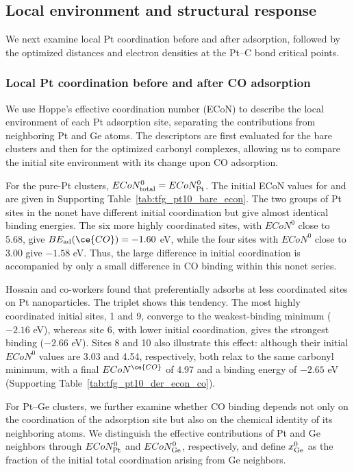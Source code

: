 \subsection{Local environment and structural response}

We next examine local Pt coordination before and after
 adsorption, followed by the optimized  distances and
electron densities at the Pt--C bond critical points.

\subsubsection{Local Pt coordination before and after CO adsorption}
\label{subsec:local_pt_coordination}

We use Hoppe's effective coordination number (ECoN) to describe the
local environment of each Pt adsorption site, separating the contributions
from neighboring Pt and Ge atoms. The descriptors are first evaluated for the
bare clusters and then for the optimized carbonyl complexes, allowing us to compare the
initial site environment with its change upon CO adsorption.


{For the pure-Pt clusters, $ECoN_{\rm total}^{0}=ECoN_{\rm Pt}^{0}$.
The initial ECoN values for  and  are given in
Supporting Table~\ref{tab:tfg_pt10_bare_econ}.
The two groups of Pt sites in the nonet  have different initial
coordination but give almost identical binding energies. The six more highly
coordinated sites, with $ECoN^{0}$ close to 5.68, give
$BE_{\rm ad}(\ce{CO})=-1.60$ eV, while the four sites with $ECoN^{0}$ close
to 3.00 give $-1.58$ eV. Thus, the
large difference in initial coordination is accompanied by only a small
difference in CO binding within this nonet series.}

{Hossain and co-workers found that  preferentially adsorbs at
less coordinated sites on Pt nanoparticles.\cite{hossain:lowcoord:2020}
The triplet  shows this tendency.
The most highly coordinated initial sites,
1 and 9, converge to the weakest-binding minimum ($-2.16$ eV), whereas site
6, with lower initial coordination, gives the strongest binding ($-2.66$ eV).
Sites 8 and 10 also illustrate this effect: although their initial
$ECoN^{0}$ values are 3.03 and 4.54, respectively, both relax to the same
carbonyl minimum, with a final $ECoN^{\ce{CO}}$ of 4.97 and a binding energy
of $-2.65$ eV
(Supporting Table~\ref{tab:tfg_pt10_der_econ_co}).}

For Pt–Ge clusters, we further examine whether CO binding depends not only on the coordination of the adsorption site but also on the chemical identity of its neighboring atoms. We distinguish the effective contributions of Pt and Ge neighbors through $ECoN_{\rm Pt}^{0}$ and $ECoN_{\rm Ge}^{0}$, respectively, and define $x_{\rm Ge}^{0}$ as the fraction of the initial total coordination arising from Ge neighbors.


